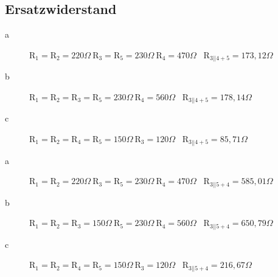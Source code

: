 \documentclass[aspectratio=169, ignorenonframetext]{beamer}
\begin{document}
\subsection{Ersatzwiderstand}
\label{lsg:Ersatzwiderstand}
\begin{frame}
\begin{description}
  \item[a] $\text{R}_1 = \text{R}_2 = 220 \Omega \ \text{R}_3 = \text{R}_5 = 230 \Omega \ \text{R}_4 = 470 \Omega$ \ $\text{R}_{3||4+5} = 173,12 \Omega$
  \item[b] $\text{R}_1 = \text{R}_2 = \text{R}_3 = \text{R}_5 = 230 \Omega \ \text{R}_4 = 560 \Omega$ \ $\text{R}_{3||4+5} = 178,14 \Omega$
  \item[c] $\text{R}_1 = \text{R}_2 = \text{R}_4 = \text{R}_5 = 150 \Omega \ \text{R}_3 = 120 \Omega$ \ $\text{R}_{3||4+5} = 85,71 \Omega$
\end{description}
\end{frame}
\begin{frame}
\begin{description}
  \item[a] $\text{R}_1 = \text{R}_2 = 220 \Omega \ \text{R}_3 = \text{R}_5 = 230 \Omega \ \text{R}_4 = 470 \Omega$ \ $\text{R}_{3||5+4} = 585,01 \Omega$
  \item[b] $\text{R}_1 = \text{R}_2 = \text{R}_3 = 150 \Omega \ \text{R}_5 = 230 \Omega \ \text{R}_4 = 560 \Omega$ \ $\text{R}_{3||5+4} =  650,79\Omega$
  \item[c] $\text{R}_1 = \text{R}_2 = \text{R}_4 = \text{R}_5 = 150 \Omega \ \text{R}_3 = 120 \Omega$ \ $\text{R}_{3||5+4} =  216,67\Omega$
\end{description}
\end{frame}
\end{document}
